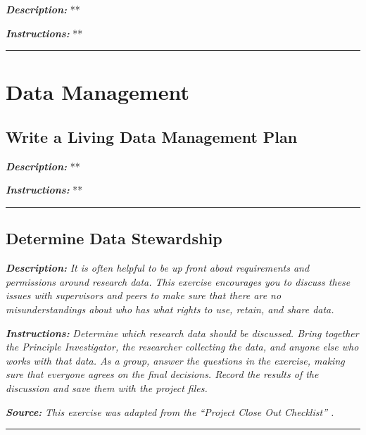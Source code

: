 \documentclass[
]{book}
\begin{document}
\textbf{\emph{Description:}} **

\textbf{\emph{Instructions:}} **

\begin{center}\rule{0.5\linewidth}{0.5pt}\end{center}

\hypertarget{data-management}{%
\chapter{Data Management}\label{data-management}}

\hypertarget{living-dmp}{%
\section{Write a Living Data Management Plan}\label{living-dmp}}

\textbf{\emph{Description:}} **

\textbf{\emph{Instructions:}} **

\begin{center}\rule{0.5\linewidth}{0.5pt}\end{center}

\hypertarget{data-governance}{%
\section{Determine Data Stewardship}\label{data-governance}}

\textbf{\emph{Description:}} \emph{It is often helpful to be up front about requirements and permissions around research data. This exercise encourages you to discuss these issues with supervisors and peers to make sure that there are no misunderstandings about who has what rights to use, retain, and share data.}

\textbf{\emph{Instructions:}} \emph{Determine which research data should be discussed. Bring together the Principle Investigator, the researcher collecting the data, and anyone else who works with that data. As a group, answer the questions in the exercise, making sure that everyone agrees on the final decisions. Record the results of the discussion and save them with the project files.}

\textbf{\emph{Source:}} \emph{This exercise was adapted from the ``Project Close Out Checklist'' \citep{briney_project_2020}.}

\begin{center}\rule{0.5\linewidth}{0.5pt}\end{center}
\end{document}
